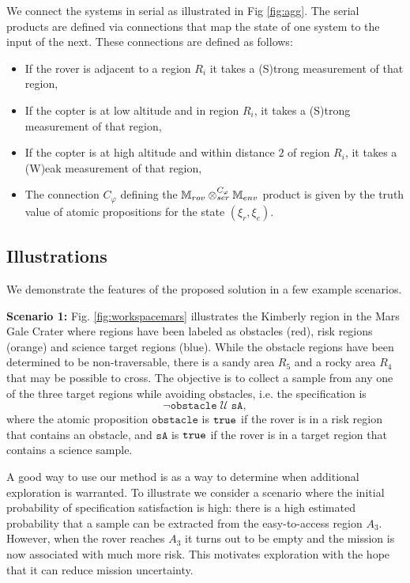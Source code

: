 \documentclass[conference]{IEEEtran}
\begin{document}
We connect the systems in serial as illustrated in Fig \ref{fig:agg}. The serial products are defined via connections that map the state of one system to the input of the next. These connections are defined as follows:
\begin{itemize}
  \item If the rover is adjacent to a region $R_i$ it takes a (S)trong measurement of that region,
  \item If the copter is at low altitude and in region $R_i$, it takes a (S)trong measurement of that region,
  \item If the copter is at high altitude and within distance $2$ of region $R_i$, it takes a (W)eak measurement of that region,
  \item The connection $C_\varphi$ defining the $\mathbb{M}_{rov} \otimes_{ser}^{C_\varphi} \mathbb{M}_{env}$ product is given by the truth value of atomic propositions for the state $(\xi_r, \xi_e)$.
\end{itemize}


\subsection{Illustrations}

We demonstrate the features of the proposed solution in a few example scenarios.

\noindent \textbf{Scenario 1:} Fig. \ref{fig:workspacemars} illustrates the Kimberly region in the Mars Gale Crater where regions have been labeled as obstacles (red), risk regions (orange) and science target regions (blue). While the obstacle regions have been determined to be non-traversable, there is a sandy area $R_5$ and a rocky area $R_4$ that may be possible to cross. The objective is to collect a sample from any one of the three target regions while avoiding obstacles, i.e. the specification is
\begin{equation}
  \lnot \texttt{obstacle} \; \mathcal U \; \texttt{sA},
\end{equation}
where the atomic proposition $\texttt{obstacle}$ is $\texttt{true}$ if the rover is in a risk region that contains an obstacle, and $\texttt{sA}$ is $\texttt{true}$ if the rover is in a target region that contains a science sample.

A good way to use our method is as a way to determine when additional exploration is warranted. To illustrate we consider a scenario where the initial probability of specification satisfaction is high: there is a high estimated probability that a sample can be extracted from the easy-to-access region $A_3$. However, when the rover reaches $A_3$ it turns out to be empty and the mission is now associated with much more risk. This motivates exploration with the hope that it can reduce mission uncertainty. 
\end{document}
